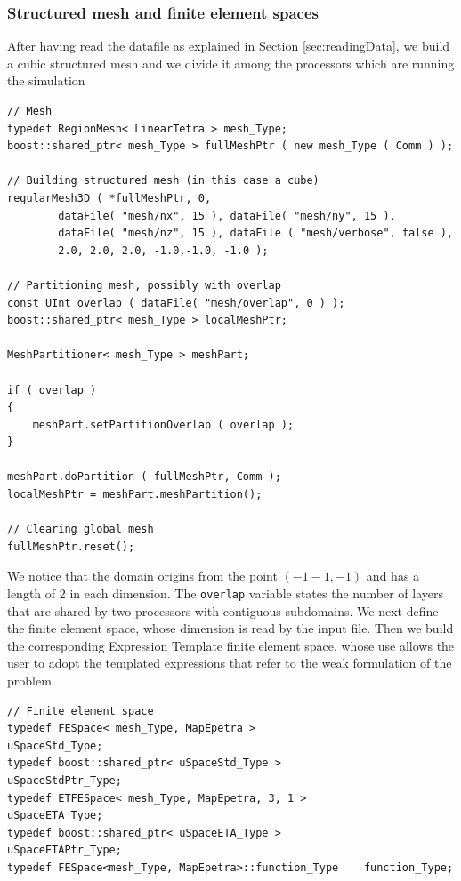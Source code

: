 \begin{itemize}
\subsubsection*{Structured mesh and finite element spaces}
After having read the datafile as explained in Section \ref{sec:readingData}, we build a cubic structured mesh and we divide it among the processors which are running the simulation

\begin{lstlisting}
// Mesh
typedef RegionMesh< LinearTetra > mesh_Type;
boost::shared_ptr< mesh_Type > fullMeshPtr ( new mesh_Type ( Comm ) );
 
// Building structured mesh (in this case a cube)
regularMesh3D ( *fullMeshPtr, 0,
        dataFile( "mesh/nx", 15 ), dataFile( "mesh/ny", 15 ), 
        dataFile( "mesh/nz", 15 ), dataFile ( "mesh/verbose", false ),
        2.0, 2.0, 2.0, -1.0,-1.0, -1.0 );

// Partitioning mesh, possibly with overlap
const UInt overlap ( dataFile( "mesh/overlap", 0 ) );
boost::shared_ptr< mesh_Type > localMeshPtr;

MeshPartitioner< mesh_Type > meshPart;

if ( overlap )
{
    meshPart.setPartitionOverlap ( overlap );
}
   
meshPart.doPartition ( fullMeshPtr, Comm );
localMeshPtr = meshPart.meshPartition();

// Clearing global mesh
fullMeshPtr.reset();
\end{lstlisting}    
We notice that the domain origins from the point $ (-1 -1, -1) $ and has a length of 2 in each dimension. The \verb!overlap! variable states the number of layers that are shared by two processors with contiguous subdomains.
\newline \noindent
We next define the finite element space, whose dimension is read by the input file. Then we build the corresponding Expression Template finite element space, whose use allows the user to adopt the templated expressions that refer to the weak formulation of the problem.
\begin{lstlisting}
// Finite element space
typedef FESpace< mesh_Type, MapEpetra >                 uSpaceStd_Type;
typedef boost::shared_ptr< uSpaceStd_Type >             uSpaceStdPtr_Type;
typedef ETFESpace< mesh_Type, MapEpetra, 3, 1 >         uSpaceETA_Type;
typedef boost::shared_ptr< uSpaceETA_Type >             uSpaceETAPtr_Type;
typedef FESpace<mesh_Type, MapEpetra>::function_Type    function_Type;


\end{lstlisting}
\end{itemize}
